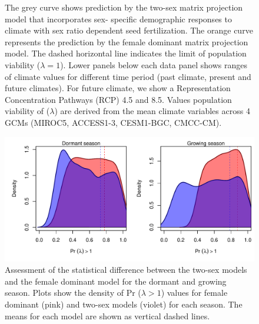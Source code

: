 \documentclass[12pt]{article}\usepackage[]{graphicx}\usepackage[dvipsnames]{xcolor}
\begin{document}
\begin{figure}[H]
\begin{center}
{			The grey curve shows prediction by the two-sex matrix projection model that incorporates sex- specific demographic responses to climate with sex ratio dependent seed fertilization.
			The orange curve represents the prediction by the female dominant matrix projection model.
			The dashed horizontal line indicates the limit of population viability ($\lambda = 1$).
			Lower panels below each data panel shows  ranges of climate values for different time period (past climate, present and future climates).
			For future climate, we show a Representation Concentration Pathways (RCP) 4.5 and 8.5. Values population viability of ($\lambda$) are derived from the mean climate variables across 4 GCMs (MIROC5, ACCESS1-3, CESM1-BGC, CMCC-CM).
		}
		\label{fig:lambda_LTRE}
	\end{center}
\end{figure}


\begin{figure}[H]
	\begin{center}
		\includegraphics[width=0.99\linewidth]{Figures/Niche_overestimation.pdf}
		\caption{ Assessment of the statistical difference between the two-sex models and the female dominant model for the dormant and growing season. 
			Plots show the density of Pr ($\lambda > 1$) values for female dominant (pink) and two-sex models (violet) for each season. 
			The means for each model are shown as vertical dashed lines. }
		\label{Sup:Niche_overestimation}
	\end{center}
\end{figure}
\end{document}
